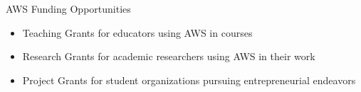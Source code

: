 \begin{frame}{AWS Funding Opportunities}
	\begin{itemize}
		\item Teaching Grants for educators using AWS in courses
		\item Research Grants for academic researchers using AWS in their work
		\item Project Grants for student organizations pursuing entrepreneurial endeavors
	\end{itemize}
\end{frame}
